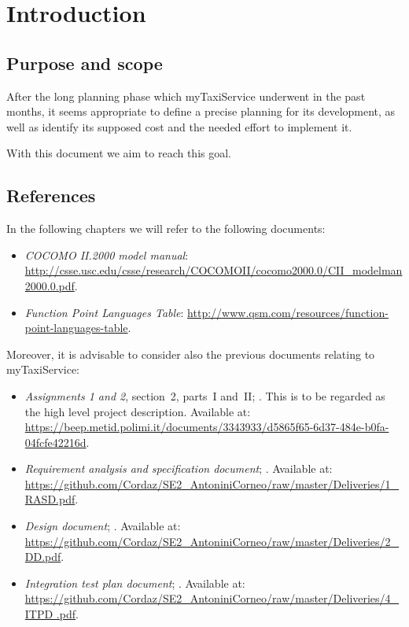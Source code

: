 \chapter{Introduction}\label{chap:introduction}


\section{Purpose and scope}
After the long planning phase which myTaxiService underwent in the past months, it seems appropriate to define a precise planning for its development, as well as identify its supposed cost and the needed effort to implement it.

With this document we aim to reach this goal.



\section{References}\label{sec:references}
In the following chapters we will refer to the following documents:\begin{itemize}
	
	\item \emph{COCOMO II.2000 model manual}: \url{http://csse.usc.edu/csse/research/COCOMOII/cocomo2000.0/CII_modelman2000.0.pdf}.
	
	\item \emph{Function Point Languages Table}: \url{http://www.qsm.com/resources/function-point-languages-table}.

\end{itemize}

Moreover, it is advisable to consider also the previous documents relating to myTaxiService:\begin{itemize}
	
	\item \emph{Assignments 1 and 2}, section~2, parts~I and~II; . This is to be regarded as the high level project description. Available at: \url{https://beep.metid.polimi.it/documents/3343933/d5865f65-6d37-484e-b0fa-04fcfe42216d}.
	
	\item \emph{Requirement analysis and specification document}; . Available at: \url{https://github.com/Cordaz/SE2_AntoniniCorneo/raw/master/Deliveries/1_RASD.pdf}.
	
	\item \emph{Design document}; . Available at: \url{https://github.com/Cordaz/SE2_AntoniniCorneo/raw/master/Deliveries/2_DD.pdf}.
	
	\item \emph{Integration test plan document}; . Available at: \url{https://github.com/Cordaz/SE2_AntoniniCorneo/raw/master/Deliveries/4_ITPD  .pdf}.
	 
\end{itemize}



